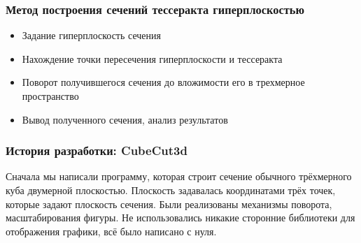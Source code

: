 \documentclass[10pt,pdf,hyperref={unicode}]{beamer}
\begin{document}
\begin{frame}
\frametitle{Метод построения сечений тессеракта гиперплоскостью}
	\begin{itemize}
		\item Задание гиперплоскость сечения
		\item Нахождение точки пересечения гиперплоскости и тессеракта
		\item Поворот получившегося сечения до вложимости его в трехмерное пространство
		\item Вывод полученного сечения, анализ результатов
	\end{itemize}
\end{frame}

\begin{frame}
\frametitle{История разработки: {\bf CubeCut3d}}
	Сначала мы написали программу, которая 
	строит сечение обычного трёхмерного куба двумерной плоскостью.
	Плоскость задавалась координатами трёх точек, которые задают плоскость сечения.
	Были реализованы механизмы поворота, масштабирования фигуры.	
	Не использовались никакие сторонние библиотеки для отображения графики,
	всё было написано с нуля. 
\end{frame}
\end{document}
